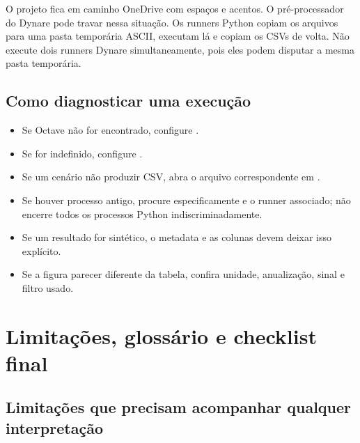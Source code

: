\documentclass[11pt,a4paper]{article}
\begin{document}
\begin{atencao}
O projeto fica em caminho OneDrive com espaços e acentos. O pré-processador do Dynare pode travar
nessa situação. Os runners Python copiam os arquivos para uma pasta temporária ASCII, executam lá e
copiam os CSVs de volta. Não execute dois runners Dynare simultaneamente, pois eles podem disputar a
mesma pasta temporária.
\end{atencao}

\subsection{Como diagnosticar uma execução}
\begin{itemize}[nosep]
  \item Se Octave não for encontrado, configure .
  \item Se  for indefinido, configure .
  \item Se um cenário não produzir CSV, abra o arquivo correspondente em .
  \item Se houver processo antigo, procure especificamente  e o runner associado;
        não encerre todos os processos Python indiscriminadamente.
  \item Se um resultado for sintético, o metadata e as colunas  devem deixar isso
        explícito.
  \item Se a figura parecer diferente da tabela, confira unidade, anualização, sinal e filtro usado.
\end{itemize}

\section{Limitações, glossário e checklist final}

\subsection{Limitações que precisam acompanhar qualquer interpretação}
\end{document}
